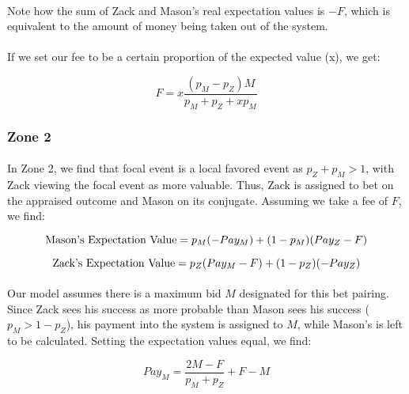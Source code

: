 \documentclass[12pt,letterpaper]{article}
\begin{document}
\paragraph{} Note how the sum of Zack and Mason’s real expectation values is $-F$, which is equivalent to the amount of money being taken out of the system.

\paragraph{} If we set our fee to be a certain proportion of the expected value (x), we get:

\begin{equation}
F = x \frac{(p_M - p_Z)M}{p_M + p_Z + x p_M}
\end{equation}
 
\subsubsection*{Zone 2}

\paragraph{} In Zone 2, we find that focal event is a local favored event as $p_Z + p_M > 1$, with Zack viewing the focal event as more valuable. Thus, Zack is assigned to bet on the appraised outcome and Mason on its conjugate. Assuming we take a fee of $F$, we find:

\begin{equation}
\textnormal{Mason's Expectation Value} = p_M (-Pay_M) + (1 - p_M)(Pay_Z - F) 
\end{equation}

\begin{equation}
\textnormal{Zack's Expectation Value} = p_Z (Pay_M - F) + (1 - p_Z )(-Pay_Z)
\end{equation}

\paragraph{} Our model assumes there is a maximum bid $M$ designated for this bet pairing. Since Zack sees his success as more probable than Mason sees his success ($p_M > 1 - p_Z$), his payment into the system is assigned to $M$, while Mason’s is left to be calculated. Setting the expectation values equal, we find:

\begin{equation}
Pay_M = \frac{2M - F}{p_M + p_Z} + F - M
\end{equation}
\end{document}
